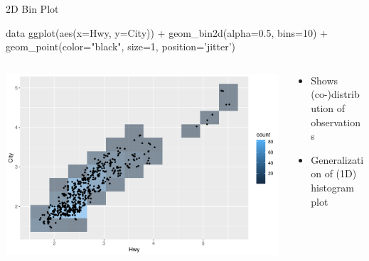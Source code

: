 \documentclass[ignorenonframetext,xcolor=x11names]{beamer}
\begin{document}
\begin{frame}[fragile]{2D Bin Plot}
\begin{Rcode}
data %
  ggplot(aes(x=Hwy, y=City)) + 
    geom_bin2d(alpha=0.5, bins=10) +
    geom_point(color="black", size=1, position='jitter')
\end{Rcode}
\begin{columns}
\begin{column}{.70\textwidth}
  \includegraphics[width=\textwidth]{fuel.bin2d.pdf}
\end{column}
\begin{column}{.35\textwidth}
\begin{itemize}
  \item Shows (co-)distribution of observations
  \item Generalization of (1D) histogram plot
\end{itemize}
\end{column}
\end{columns}
\end{frame}

\end{document}
